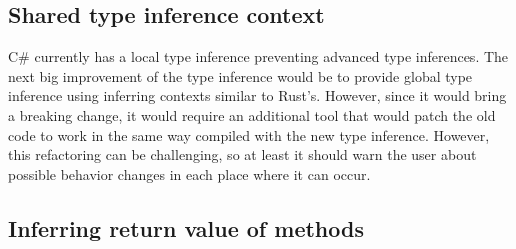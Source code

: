 \subsection{Shared type inference context}

C\# currently has a local type inference preventing advanced type inferences. 
The next big improvement of the type inference would be to provide global type inference using inferring contexts similar to Rust's. 
However, since it would bring a breaking change, it would require an additional tool that would patch the old code to work in the same way compiled with the new type inference. 
However, this refactoring can be challenging, so at least it should warn the user about possible behavior changes in each place where it can occur.

\subsection{Inferring return value of methods}

